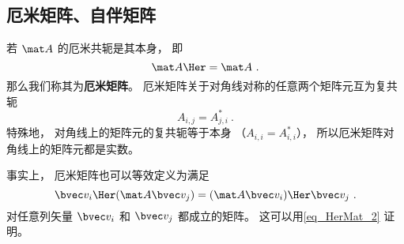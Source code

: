 \subsection{厄米矩阵、自伴矩阵}
若 $\mat A$ 的厄米共轭是其本身， 即
\begin{equation}
\mat A\Her = \mat A~.
\end{equation}
那么我们称其为\textbf{厄米矩阵}。 厄米矩阵关于对角线对称的任意两个矩阵元互为复共轭
\begin{equation}
A_{i,j} = A_{j,i}^*~.
\end{equation}
特殊地， 对角线上的矩阵元的复共轭等于本身 （$A_{i,i} = A_{i,i}^*$）， 所以厄米矩阵对角线上的矩阵元都是实数。

事实上， 厄米矩阵也可以等效定义为满足
\begin{equation}
\bvec v_i\Her (\mat A \bvec v_j) = (\mat A \bvec v_i)\Her \bvec v_j~.
\end{equation}
对任意列矢量 $\bvec v_i$ 和 $\bvec v_j$ 都成立的矩阵。 这可以用\autoref{eq_HerMat_2} 证明。